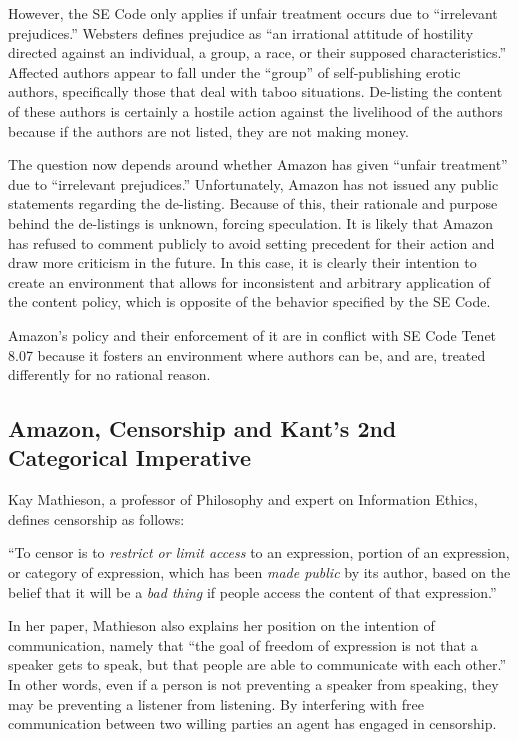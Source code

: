 \documentclass[11pt]{article}
\begin{document}
\begin{multicols}{2}
However, the SE Code only applies if unfair treatment occurs due to ``irrelevant prejudices.''  Websters defines prejudice as ``an irrational attitude of hostility directed against an individual, a group, a race, or their supposed characteristics.'' \cite{WebsterOnlineDict} Affected authors appear to fall under the ``group'' of self-publishing erotic authors, specifically those that deal with taboo situations.  De-listing the content of these authors is certainly a hostile action against the livelihood of the authors because if the authors are not listed, they are not making money.

The question now depends around whether Amazon has given ``unfair treatment'' due to ``irrelevant prejudices.''  Unfortunately, Amazon has not issued any public statements regarding the de-listing.  Because of this, their rationale and purpose behind the de-listings is unknown, forcing speculation.  It is likely that Amazon has refused to comment publicly to avoid setting precedent for their action and draw more criticism in the future.  In this case, it is clearly their intention to create an environment that allows for inconsistent and arbitrary application of the content policy, which is opposite of the behavior specified by the SE Code.

Amazon's policy and their enforcement of it are in conflict with SE Code Tenet 8.07 because it fosters an environment where authors can be, and are, treated differently for no rational reason.

\subsection{Amazon, Censorship and Kant's 2nd Categorical Imperative}

Kay Mathieson, a professor of Philosophy and expert on Information Ethics, defines censorship as follows:

{\addtolength{\leftskip}{6mm}

``To censor is to \emph{restrict or limit access} to an expression, portion of an expression, or category of expression, which has been \emph{made public} by its author, based on the belief that it will be a \emph{bad thing} if people access the content of that expression.'' \cite[Emphasis Mine]{MathiesenCensorship}

}

In her paper, Mathieson also explains her position on the intention of communication, namely that ``the goal of freedom of expression is not that a speaker gets to speak, but that people are able to communicate with each other.''   \cite{MathiesenCensorship} In other words, even if a person is not preventing a speaker from speaking, they may be preventing a listener from listening.  By interfering with free communication between two willing parties an agent has engaged in censorship. 


\end{multicols}
\end{document}
